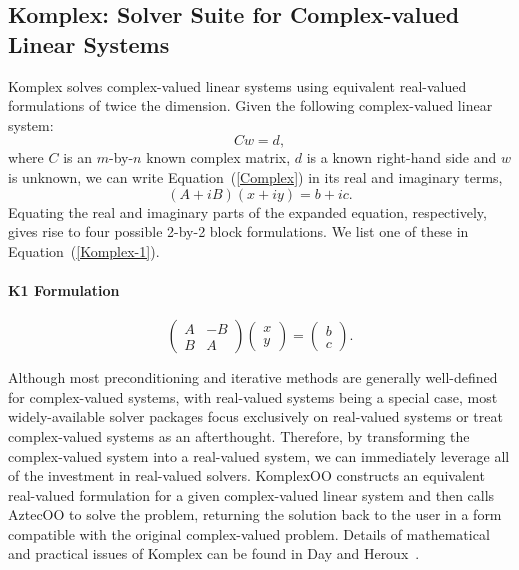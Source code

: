 \documentclass[12pt,relax]{TrilinosOverview}
\begin{document}
\subsection{Komplex: Solver Suite for Complex-valued Linear Systems}

Komplex solves complex-valued linear systems using equivalent 
real-valued formulations of twice the dimension.  Given the following 
complex-valued linear system:
\begin{equation}
\label{Complex}
C w = d,
\end{equation}
where $C$ is an $m$-by-$n$ known
complex matrix, $d$ is a known right-hand side and $w$ is unknown, 
we can write Equation~(\ref{Complex})
in its real and imaginary terms,
\begin{equation}\label{linearsystem}
( A + i B )(x+iy) = b+ic.
\end{equation}
Equating the real and imaginary parts of the expanded equation, 
respectively, gives rise to four
possible 2-by-2 block formulations.  We list one of these in 
Equation~(\ref{Komplex-1}).
\paragraph{K1 Formulation}
\begin{equation}\label{Komplex-1}
   \left( \begin{array}{rr}
                       A & -B  \\
                       B &  A
   \end{array}
   \right)
   \left( \begin{array}{r}
                                    x  \\
                                    y
                             \end{array}
   \right)
   =
   \left( \begin{array}{r}
                                    b  \\
                                    c
                             \end{array}
   \right).
\end{equation}

Although most preconditioning and iterative methods are generally 
well-defined for complex-valued systems, with real-valued systems 
being a special case, most widely-available solver packages focus 
exclusively on real-valued systems or treat complex-valued systems 
as an afterthought.  Therefore, by transforming the complex-valued 
system into a real-valued system, we can immediately leverage all 
of the investment in real-valued solvers.  KomplexOO constructs an 
equivalent real-valued formulation for a given complex-valued linear 
system and then calls AztecOO to solve the problem, returning the 
solution back to the user in a form compatible with the original 
complex-valued problem.  Details of mathematical and practical 
issues of Komplex can be found in Day and Heroux~\cite{DayHero2001}.
\end{document}
